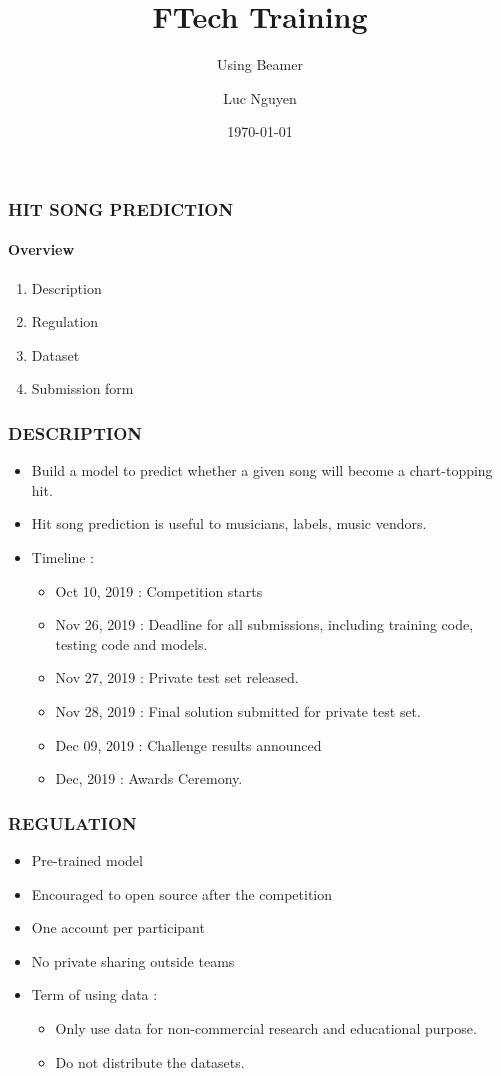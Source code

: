 \documentclass[11pt]{beamer}
\title{FTech Training}
\subtitle{Using Beamer}
\author{Luc Nguyen}
\institute{HUST}
\date{\today}
\begin{document}
\begin{frame}
\frametitle{\textbf{HIT SONG PREDICTION}}
\framesubtitle{\textbf{Overview}}
\begin{enumerate}
	\item Description
	\item Regulation
	\item Dataset
	\item Submission form
\end{enumerate}
\end{frame}

\begin{frame}
\frametitle{DESCRIPTION}
\begin{itemize}
	\pause\item Build a model to predict whether a given song will become a chart-topping hit.
	\pause\item Hit song prediction is useful to musicians, labels, music vendors.
	\pause\item Timeline : 
	\begin{itemize}
		\pause\item Oct 10, 2019 : Competition starts
		\pause\item Nov 26, 2019 : Deadline for all submissions, including training code, testing code and models.
		\pause\item Nov 27, 2019 : Private test set released.
		\pause\item Nov 28, 2019 : Final solution submitted for private test set.
		\pause\item Dec 09, 2019 : Challenge results announced
		\pause\item Dec, 2019 : Awards Ceremony.
	\end{itemize}
\end{itemize}
\end{frame}

\begin{frame}
\frametitle{REGULATION}
\begin{itemize}
	\pause\item Pre-trained model
	\pause\item Encouraged to open source after the competition
	\pause\item One account per participant
	\pause\item No private sharing outside teams
	\pause\item Term of using data : 
	\pause \begin{itemize}
		\item Only use data for non-commercial research and educational purpose.
		\item Do not distribute the datasets.
	\end{itemize}
\end{itemize}
\end{frame}
\end{document}
